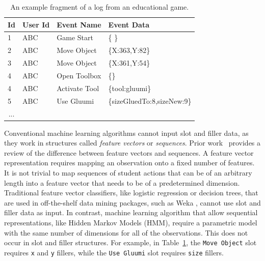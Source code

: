 \documentclass{sigchi}
\begin{document}
\begin{table}[tbh]
	\begin{tabular}{@{}llll@{}}
		\toprule
		\textbf{Id}             & \textbf{User Id} & \textbf{Event Name} & \textbf{Event Data}        \\ \midrule
		1                       & ABC              & Game Start          & \{ \}                        \\
		2                       & ABC              & Move Object         & \{X:363,Y:82\} \\
		3                       & ABC              & Move Object         & \{X:361,Y:54\} \\
		4                       & ABC              & Open Toolbox        & \{\}        \\
		4                       & ABC              & Activate Tool        & \{tool:gluumi\}        \\
		5                       & ABC              & Use Gluumi        & \{sizeGluedTo:8,sizeNew:9\} \\        
		\multicolumn{1}{c}{...} &                  &                     &                            \\ \bottomrule
	\end{tabular}
	\caption{An example fragment of a log from an educational game. \label{tbl:log_example}}
\end{table}

Conventional machine learning algorithms cannot input slot and filler data, as they  work in  structures called \textit{feature vectors} or \textit{sequences}.
Prior work~\cite{sequences} provides a   review of  the difference between feature vectors and sequences.
A feature vector representation requires mapping an observation onto a fixed number of features.
It is not trivial to map sequences of student actions that can be of an arbitrary length into a feature vector that needs to be of a predetermined dimension.
Traditional feature vector classifiers,  like logistic regression or decision trees,  that are used in off-the-shelf data mining packages, such as Weka \cite{hall2009weka}, cannot  use slot and filler data as input. 
In contrast, machine learning algorithm that allow sequential representations, like Hidden Markov Models (HMM), require a parametric model with the same number of dimensions for all of the observations.
This does not occur in slot and filler structures.
For example,  in Table~\ref{tbl:log_example}, the \texttt{Move Object} slot requires \texttt{x} and \texttt{y} fillers, while the \texttt{Use Gluumi} slot requires \texttt{size} fillers.
\end{document}
